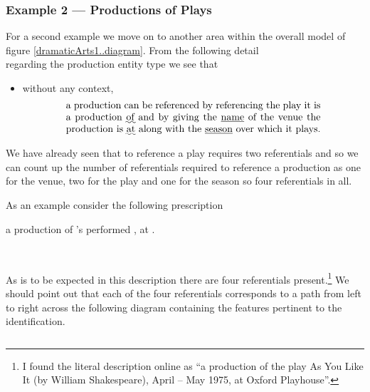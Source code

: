 \subsubsection{Example 2 --- Productions of Plays}


For a second example we move on to another area within the overall model of figure \ref{dramaticArts1..diagram}. From the following detail 
\begin{equation*}

\end{equation*}
regarding the production entity type  we see that
\begin{itemize}
  \item
  without any context, 
  \begin{equation} 
\label{absoluteCharacterReferencing}
\text{\parbox{9cm}{a production can be referenced by referencing the play it is a production \uwave{of} 
  and by giving the \underline{name} of the venue  the production is \uwave{at} along with the \underline{season} 
  over which it plays.}}
\end{equation}
\end{itemize}
We have already seen that to reference a play requires two referentials and so
we can count up the number of referentials required to reference a production
as one for the venue, two for the play and one for the season so four referentials in all. 

As an example consider the following prescription
\begin{erquote}
\parbox{9cm}{a production of \mbox{'s} 
 performed \mbox{,} at .}\\
\end{erquote}
As is to be expected in this description there are four referentials present.\footnote{
I found the literal description online as ``a production of the play As You Like It (by William Shakespeare), April – May 1975, at Oxford Playhouse''.  
} 
We should point out that each of the four referentials corresponds to a path from left to right across the following diagram containing the features pertinent to the identification.

\begin{equation*}

\end{equation*}

